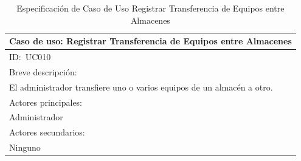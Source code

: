 \documentclass[stu, 12pt, letterpaper, donotrepeattitle, floatsintext, natbib]{apa7}
\begin{document}
\begin{longtable}{@{} p{16.5cm} @{}}
    \caption{Especificaci\'on de Caso de Uso Registrar Transferencia de Equipos entre Almacenes}\label{tab:UC010}                                                                                                                            \\ \toprule
    \multicolumn{1}{c}{Caso de uso: Registrar Transferencia de Equipos entre Almacenes}                                                                                                                                                      \\ \midrule
    ID:~UC010                                                                                                                                                                                                                                \\ \midrule
    Breve descripci\'on:                                                                                                                                                                                                                     \\
    El administrador transfiere uno o varios equipos de un almac\'en a otro.                                                                                                                                                                 \\ \midrule
    Actores principales:                                                                                                                                                                                                                     \\
    Administrador                                                                                                                                                                                                                            \\ \midrule
    Actores secundarios:                                                                                                                                                                                                                     \\
    Ninguno                                                                                                                                                                                                                                  \\ \midrule

\end{longtable}
\end{document}
